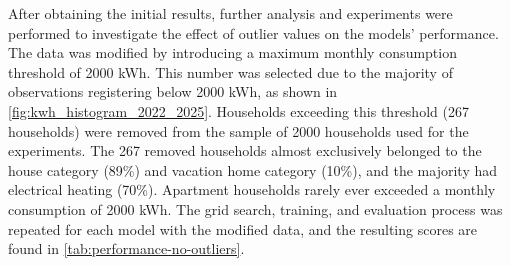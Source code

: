 After obtaining the initial results, further analysis and experiments were performed to investigate the effect of outlier values on the models' performance. The data was modified by introducing a maximum monthly consumption threshold of 2000 kWh. This number was selected due to the majority of observations registering below 2000 kWh, as shown in \autoref{fig:kwh_histogram_2022_2025}. Households exceeding this threshold (267 households) were removed from the sample of 2000 households used for the experiments. The 267 removed households almost exclusively belonged to the house category (89\%) and vacation home category (10\%), and the majority had electrical heating (70\%). Apartment households rarely ever exceeded a monthly consumption of 2000 kWh. %
The grid search, training, and evaluation process was repeated for each model with the modified data, and the resulting scores are found in \autoref{tab:performance-no-outliers}.

